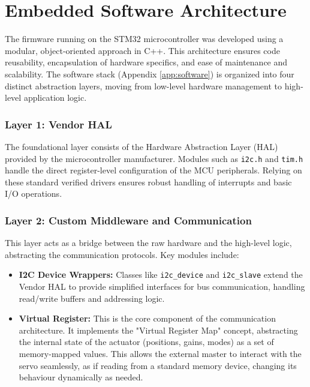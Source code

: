 \section{Embedded Software Architecture}

The firmware running on the STM32 microcontroller was developed using a modular, object-oriented approach in
C++. This architecture ensures code reusability, encapsulation of hardware specifics, and ease of maintenance
and scalability. The software stack (Appendix \ref{app:software}) is organized into four distinct abstraction
layers, moving from low-level hardware management to high-level application logic.


\subsubsection{Layer 1: Vendor HAL}

The foundational layer consists of the Hardware Abstraction Layer (HAL) provided by the microcontroller
manufacturer. Modules such as \texttt{i2c.h} and \texttt{tim.h} handle the direct register-level configuration
of the MCU peripherals. Relying on these standard verified drivers ensures robust handling of interrupts and
basic I/O operations.


\subsubsection{Layer 2: Custom Middleware and Communication}

This layer acts as a bridge between the raw hardware and the high-level logic, abstracting the communication
protocols. Key modules include:

\begin{itemize}
    \item \textbf{I2C Device Wrappers:} Classes like \texttt{i2c\_device} and \texttt{i2c\_slave} extend the
        Vendor HAL to provide simplified interfaces for bus communication, handling read/write buffers and
        addressing logic.
    \item \textbf{Virtual Register:} This is the core component of the communication architecture. It
        implements the "Virtual Register Map" concept, abstracting the internal state of the actuator
        (positions, gains, modes) as a set of memory-mapped values. This allows the external master to
        interact with the servo seamlessly, as if reading from a standard memory device, changing its
        behaviour dynamically as needed.
\end{itemize}


